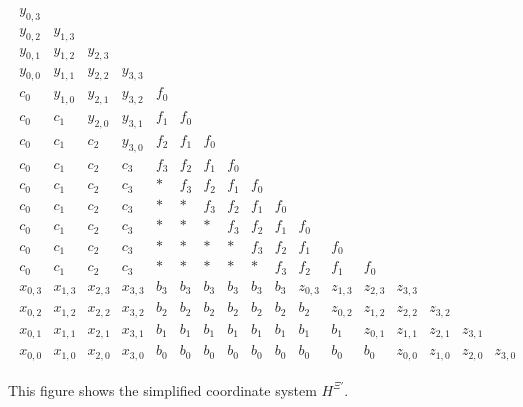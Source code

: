 \begin{definition}
\begin{figure}[H]
    \begin{align*}
        \begin{array}{cccccccccccccccccccc}
            y_{0,3} & & & & & & & & & & & & \\
            y_{0,2} & y_{1,3} & & & & & & & & & & & \\
            y_{0,1} & y_{1,2} & y_{2,3} & & & & & & & & & & \\
            y_{0,0} & y_{1,1} & y_{2,2} & y_{3,3} & & & & & & & & & \\
            c_0 & y_{1,0} & y_{2,1} & y_{3,2} & f_0 & & & & & & & & \\
            c_0 & c_1 & y_{2,0} & y_{3,1} & f_1 & f_0 & & & & & & & \\
            c_0 & c_1 & c_2 & y_{3,0} & f_2 & f_1 & f_0 & & & & & & \\
            c_0 & c_1 & c_2 & c_3 & f_3 & f_2 & f_1 & f_0 & & & & & \\
            c_0 & c_1 & c_2 & c_3 &  *  & f_3 & f_2 & f_1 & f_0 & & & & \\
            c_0 & c_1 & c_2 & c_3 &  *  & * & f_3 & f_2 & f_1 & f_0 & & & \\
            c_0 & c_1 & c_2 & c_3 &  *  & * & * & f_3 & f_2 & f_1 & f_0 & & \\
            c_0 & c_1 & c_2 & c_3 &  *  & * & * & * & f_3 & f_2 & f_1 & f_0 & \\
            c_0 & c_1 & c_2 & c_3 &  *  & * & * & * & * & f_3 & f_2 & f_1 & f_0 \\
            x_{0,3} & x_{1,3} & x_{2,3} & x_{3,3} & b_3 & b_3 & b_3 & b_3 & b_3 & b_3 & z_{0,3} & z_{1,3} & z_{2,3} & z_{3,3} \\
            x_{0,2} & x_{1,2} & x_{2,2} & x_{3,2} & b_2 & b_2 & b_2 & b_2 & b_2 & b_2 & b_2 & z_{0,2} & z_{1,2} & z_{2,2} & z_{3,2} \\
            x_{0,1} & x_{1,1} & x_{2,1} & x_{3,1} & b_1 & b_1 & b_1 & b_1 & b_1 & b_1 & b_1 & b_1 & z_{0,1} & z_{1,1} & z_{2,1} & z_{3,1} \\
            x_{0,0} & x_{1,0} & x_{2,0} & x_{3,0} & b_0 & b_0 & b_0 & b_0 & b_0 & b_0 & b_0 & b_0 & b_0 & z_{0,0} & z_{1,0} & z_{2,0} & z_{3,0}
        \end{array}
    \end{align*}  
    \caption{This figure shows the simplified coordinate system \( H^{\Xi'} \).}
    \label{fig:uhrui23h}
\end{figure}

\end{definition}

